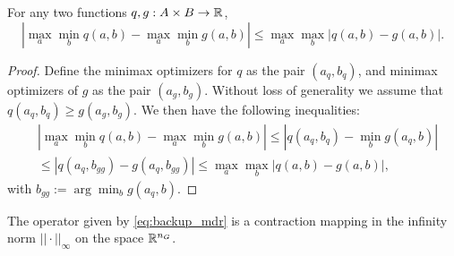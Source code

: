 %
\begin{lemma}\label{lem:maxmin} For any two functions $q, g: A \times B \rightarrow \mathbb{R}$,
\begin{equation}
|\max_a \min_b q(a,b) -\max_a \min_b g(a,b)| \leq \max_a \max_b |q(a,b) - g(a,b)|
.
\end{equation}
\end{lemma}
%
\begin{proof}
Define the minimax optimizers for $q$ as the pair $(a_q,b_q)$, and minimax optimizers of $g$ as the pair $(a_g, b_g)$. Without loss of generality we assume that ${q(a_q,b_q) \geq g(a_g,b_g)}$.
We then have the following inequalities:
%
\begin{equation*}
\begin{split}
&|\max_a \min_b q(a,b) -\max_a \min_b g(a,b)|
\leq |q(a_q,b_q) - \min_b g(a_q,b)|\\
&\leq |q(a_q,b_{gg}) - g(a_q,b_{gg})| \leq \max_a \max_b |q(a,b) - g(a,b)|
,
\end{split}
\end{equation*}
with $b_{gg} :=\displaystyle{\arg\min_b g(a_q,b)}$.
%
\end{proof}
%
\begin{theorem} 
The operator given by \eqref{eq:backup_mdr} is a contraction mapping in the infinity norm $|| \cdot ||_{\infty}$ on the space $\mathbb{R}^{n_G}$.
\end{theorem}
